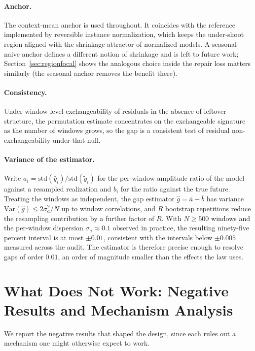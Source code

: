 \paragraph{Anchor.}
The context-mean anchor is used throughout. It coincides with the reference implemented by reversible instance normalization, which keeps the under-shoot region aligned with the shrinkage attractor of normalized models. A seasonal-naive anchor defines a different notion of shrinkage and is left to future work; Section~\ref{sec:regionfocal} shows the analogous choice inside the repair loss matters similarly (the seasonal anchor removes the benefit there).

\paragraph{Consistency.}
Under window-level exchangeability of residuals in the absence of leftover structure, the permutation estimate concentrates on the exchangeable signature as the number of windows grows, so the gap is a consistent test of residual non-exchangeability under that null.

\paragraph{Variance of the estimator.}
Write $a_i = \mathrm{std}(\hat{y}_i)/\mathrm{std}(\tilde{y}_i)$ for the per-window amplitude ratio of the model against a resampled realization and $b_i$ for the ratio against the true future. Treating the windows as independent, the gap estimator $\hat{g} = \bar{a} - \bar{b}$ has variance $\mathrm{Var}(\hat{g}) \le 2\sigma_a^2 / N$ up to window correlations, and $R$ bootstrap repetitions reduce the resampling contribution by a further factor of $R$. With $N \ge 500$ windows and the per-window dispersion $\sigma_a \approx 0.1$ observed in practice, the resulting ninety-five percent interval is at most $\pm 0.01$, consistent with the intervals below $\pm 0.005$ measured across the audit. The estimator is therefore precise enough to resolve gaps of order $0.01$, an order of magnitude smaller than the effects the law uses.

\section{What Does Not Work: Negative Results and Mechanism Analysis}
\label{app:negative}

We report the negative results that shaped the design, since each rules out a mechanism one might otherwise expect to work.


